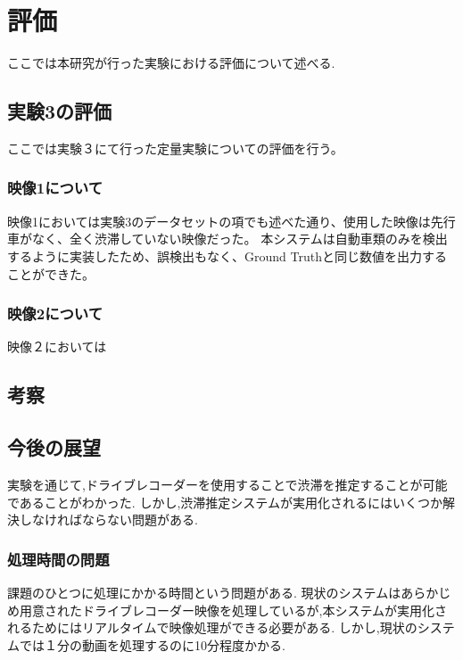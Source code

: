 \chapter{評価}
ここでは本研究が行った実験における評価について述べる.

\section{実験3の評価}
ここでは実験３にて行った定量実験についての評価を行う。

\subsection{映像1について}
映像1においては実験3のデータセットの項でも述べた通り、使用した映像は先行車がなく、全く渋滞していない映像だった。
本システムは自動車類のみを検出するように実装したため、誤検出もなく、Ground Truthと同じ数値を出力することができた。

\subsection{映像2について}
映像２においては

\section{考察}

\section{今後の展望}
実験を通じて,ドライブレコーダーを使用することで渋滞を推定することが可能であることがわかった.
しかし,渋滞推定システムが実用化されるにはいくつか解決しなければならない問題がある.
\subsection{処理時間の問題}
課題のひとつに処理にかかる時間という問題がある.
現状のシステムはあらかじめ用意されたドライブレコーダー映像を処理しているが,本システムが実用化されるためにはリアルタイムで映像処理ができる必要がある.
しかし,現状のシステムでは１分の動画を処理するのに10分程度かかる.


